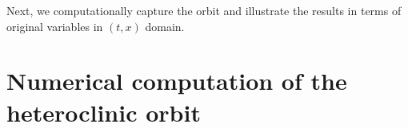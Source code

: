 \documentclass[a4paper,11pt]{article}
\theoremstyle{remark}
\begin{document}
Next, we computationally capture the orbit and illustrate the results in terms of original variables in $(t,x)$ domain.

\section{Numerical computation of the heteroclinic orbit} \label{sec:num_cont}

\begin{figure}[ht]
 \centering
  \quad \quad
  \quad \quad
\end{figure}
\end{document}
